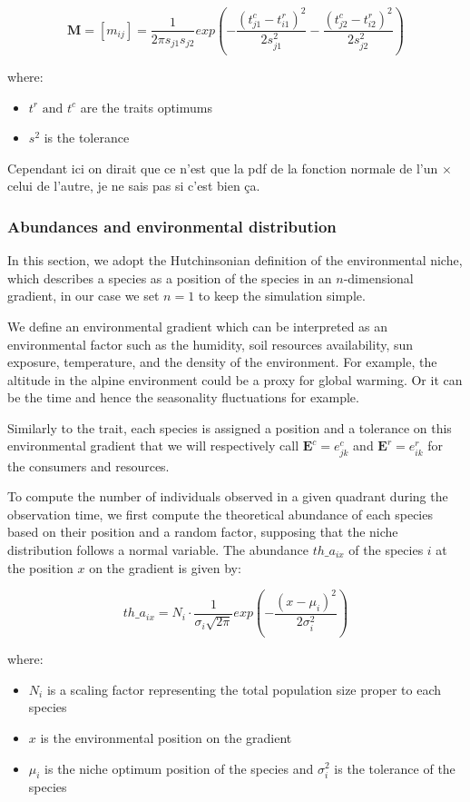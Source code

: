 $$
    \mathbf{M} = [m_{ij}]=\frac{1}{2\pi s_{j1}s_{j2}} exp\left(-\frac{(t^c_{j1} - t^r_{i1})^2}{2s^2_{j1}} - \frac{(t^c_{j2} - t^r_{i2})^2}{2s^2_{j2}}\right)
$$

where:
\begin{itemize}
    \item $t^r \text{ and }t^c$ are the traits optimums
    \item $s^2$ is the tolerance
\end{itemize}

Cependant ici on dirait que ce n'est que la pdf de la fonction normale de l'un $\times$ celui de l'autre, je ne sais pas si c'est bien ça.




\subsubsection{Abundances and environmental distribution}



In this section, we adopt the  Hutchinsonian definition of the environmental niche, which describes a species as a position of the species in an $n$-dimensional gradient, in our case we set $n=1$ to keep the simulation simple.

We define an environmental gradient which can be interpreted as an environmental factor such as the humidity, soil resources availability, sun exposure, temperature, and the density of the environment. For example, the altitude in the alpine environment could be a proxy for global warming. Or it can be the time and hence the seasonality fluctuations for example.

Similarly to the trait, each species is assigned a position and a tolerance on this environmental gradient that we will respectively call $\mathbf{E}^c = e_{jk}^c$ and $\mathbf{E}^r = e_{ik}^r$ for the consumers and resources.

To compute the number of individuals observed in a given quadrant during the observation time, we first compute the theoretical abundance of each species based on their position and a random factor, supposing that the niche distribution follows a normal variable.
The abundance $th\_a_{ix}$ of the species $i$ at the position $x$ on the gradient is given by:

$$
    th\_a_{ix} = N_i \cdot \frac{1}{\sigma_i\sqrt{2\pi}} exp \left( -\frac{(x-\mu_i)^2}{2\sigma_i^2} \right)
$$

where:
\begin{itemize}
    \item $N_i$ is a scaling factor representing the total population size proper to each species
    \item $x$ is the environmental position on the gradient
    \item $\mu_i$ is the niche optimum position of the species and $\sigma_i^2$ is the tolerance of the species
\end{itemize}

